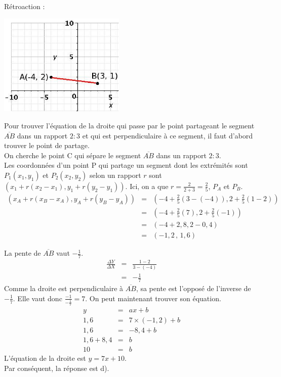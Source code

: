 \documentclass[letterpaper, 12pt]{article}
\begin{document}
R\'etroaction :\\
\begin{center}
 \includegraphics[width=6cm,bb=14 14 329 231]{Q2489.eps}
\end{center}
Pour trouver l'\'equation de la droite qui passe par le point partageant le segment $\overline{AB}$ dans un rapport $2:3$ et qui est perpendiculaire \`a ce segment, il faut d'abord trouver le point de partage.\\

On cherche le point C qui s\'epare le segment $\overline{AB}$ dans un rapport $2:3$.\\
Les coordonn\'ees d'un point P qui partage un segment dont les extr\'emit\'es sont $P_{1}(x_{1}, y_{1})$ et $P_{2}(x_{2}, y_{2})$ selon un rapport $r$ sont $\left( x_{1}+r(x_{2}-x_{1}), y_{1}+r(y_{2}-y_{1})\right) $. Ici, on a que $r=\frac{2}{2+3}=\frac{2}{5}$, $P_{A}$ et $P_{B}$.
\begin{eqnarray*}
\left( x_{A}+r(x_{B}-x_{A}), y_{A}+r(y_{B}-y_{A})\right)&=&\left( -4+\frac{2}{5}(3-(-4)), 2+\frac{2}{5}(1-2)\right)\\[2mm]
&=&\left( -4+\frac{2}{5}(7), 2+\frac{2}{5}(-1)\right)\\[2mm]
&=&\left( -4+2,8, 2-0,4\right)\\[2mm]
&=&\left( -1,2\, ,\, 1,6\right)
\end{eqnarray*}

La pente de $\overline{AB}$ vaut $-\frac{1}{7}$.
\begin{eqnarray*}
 \frac{\Delta Y}{\Delta X}&=&\frac{1-2}{3-(-4)}\\[2mm]
&=&-\frac{1}{7}
\end{eqnarray*}
Comme la droite est perpendiculaire \`a $\overline{AB}$, sa pente est l'oppos\'e de l'inverse de $-\frac{1}{7}$. Elle vaut donc $\frac{-1}{-\frac{1}{7}}=7$. On peut maintenant trouver son \'equation.
\begin{eqnarray*}
 y&=&ax+b\\
 1,6&=&7\times (-1,2)+b\\[2mm]
 1,6&=&-8,4+b\\[2mm]
 1,6+8,4&=&b\\[2mm]
 10&=&b
\end{eqnarray*}
L'\'equation de la droite est $y=7x+10$.\\
Par cons\'equent, la r\'eponse est d).\\
\end{document}
